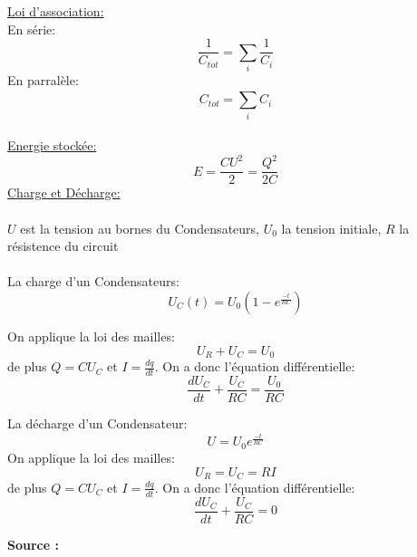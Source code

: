 \documentclass[12pt, letterpaper]{article}
\begin{document}
\underline{Loi d'association:}
\\
En série:
\[
\frac{1}{C_{tot}} = \sum_{i}^{}\frac{1}{C_i}
\]
En parralèle:
\[
C_{tot} = \sum_{i}^{} C_i
\]
\\
\underline{Energie stockée:}
\[
E = \frac{CU^2}{2} = \frac{Q^2}{2C}
\]
\underline{Charge et Décharge: }
\\
\\
$U$ est la tension au bornes du Condensateurs, $U_0$ la tension initiale, $R$ la résistence du circuit
\\
\\
La charge d'un Condensateurs:
\[
U_C(t) = U_0(1-e^{\frac{-t}{RC}})
\]

On applique la loi des mailles:
\[
U_R + U_C = U_0
\]
de plus $Q = C U_C$ et $I = \frac{dq}{dt}$. On a donc l'équation différentielle:
\[
\frac{dU_C}{dt} + \frac{U_C}{RC} = \frac{U_0}{RC}
\]


\noindent La décharge d'un Condensateur:
\[
U = U_0e^{\frac{-t}{RC}}
\]
On applique la loi des mailles:
\[
U_R = U_C = RI
\]
de plus $Q = C U_C$ et $I = \frac{dq}{dt}$. On a donc l'équation différentielle:
\[
\frac{dU_C}{dt} + \frac{U_C}{RC} = 0
\]

\newpage
\textbf{Source :} \\
\end{document}
